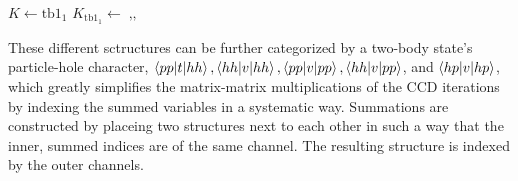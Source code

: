 \begin{algorithmic}
  \State $K\gets\text{tb1}_{1}$
  \State $K_{\text{tb1}_{1}}\gets\mathop{\text{tb1}_{2},\text{tb2}_{1},\text{tb2}_{2}}$
  \EndFor
  \EndFor
  \EndFor
\end{algorithmic}

These different sctructures can be further categorized by a two-body state's particle-hole character, $\braket{pp| t |hh}, \braket{hh| v |hh}, \braket{pp| v |pp}, \braket{hh| v |pp}$, and $\braket{hp| v |hp}$, which greatly simplifies the matrix-matrix multiplications of the CCD iterations by indexing the summed variables in a systematic way. Summations are constructed by placeing two structures next to each other in such a way that the inner, summed indices are of the same channel. The resulting structure is indexed by the outer channels.

